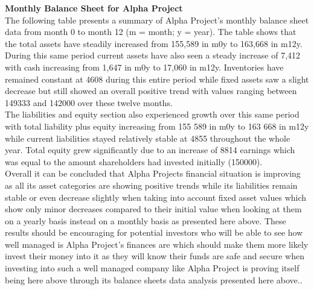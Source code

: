 


\textbf{Monthly Balance Sheet for Alpha Project}\\
The following table presents a summary of Alpha Project's monthly balance sheet data from month 0 to month 12 (m = month; y = year). The table shows that the total assets have steadily increased from 155,589 in m0y to 163,668 in m12y. During this same period current assets have also seen a steady increase of 7,412 with cash increasing from 1,647 in m0y to 17,060 in m12y. Inventories have remained constant at 4608 during this entire period while fixed assets saw a slight decrease but still showed an overall positive trend with values ranging between 149333 and 142000 over these twelve months.  \\
The liabilities and equity section also experienced growth over this same period with total liability plus equity increasing from 155 589 in m0y to 163 668 in m12y while current liabilities stayed relatively stable at 4855 throughout the whole year. Total equity grew significantly due to an increase of 8814 earnings which was equal to the amount shareholders had invested initially (150000). \\ 
Overall it can be concluded that Alpha Projects financial situation is improving as all its asset categories are showing positive trends while its liabilities remain stable or even decrease slightly when taking into account fixed asset values which show only minor decreases compared to their initial value when looking at them on a yearly basis instead on a monthly basis as presented here above. These results should be encouraging for potential investors who will be able to see how well managed is Alpha Project's finances are which should make them more likely invest their money into it as they will know their funds are safe and secure when investing into such a well managed company like Alpha Project is proving itself being here above through its balance sheets data analysis presented here above..